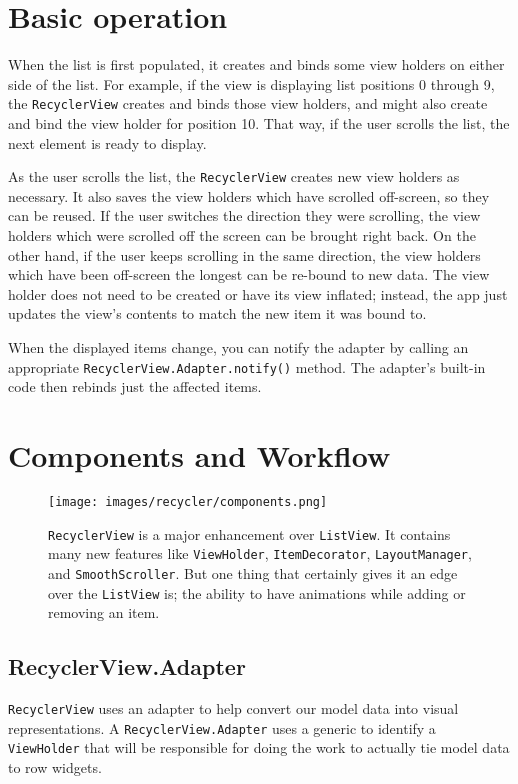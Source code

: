 \section{Basic operation}
When the list is first populated, it creates and binds some view holders on either side of the list.
For example, if the view is displaying list positions 0 through 9, the \lstinline!RecyclerView! creates and binds those view holders, and might also create and bind the view holder for position 10.
That way, if the user scrolls the list, the next element is ready to display.

As the user scrolls the list, the \lstinline!RecyclerView! creates new view holders as necessary.
It also saves the view holders which have scrolled off-screen, so they can be reused.
If the user switches the direction they were scrolling, the view holders which were scrolled off the screen can be brought right back.
On the other hand, if the user keeps scrolling in the same direction, the view holders which have been off-screen the longest can be re-bound to new data.
The view holder does not need to be created or have its view inflated; instead, the app just updates the view's contents to match the new item it was bound to.

When the displayed items change, you can notify the adapter by calling an appropriate \lstinline!RecyclerView.Adapter.notify()! method.
The adapter's built-in code then rebinds just the affected items.

\section{Components and Workflow}

\begin{figure}
	\texttt{[image: images/recycler/components.png]}
	\caption{ \lstinline!RecyclerView! is a major enhancement over \lstinline!ListView!.
It contains many new features like \lstinline!ViewHolder!, \lstinline!ItemDecorator!, \lstinline!LayoutManager!, and \lstinline!SmoothScroller!.
But one thing that certainly gives it an edge over the \lstinline!ListView! is; the ability to have animations while adding or removing an item.}
	\label{fig:recyclercomponents}
\end{figure}


\subsection{RecyclerView.Adapter}
\lstinline!RecyclerView! uses an adapter to help convert our model data into visual representations.
A \lstinline!RecyclerView.Adapter!  uses a generic to identify a \lstinline!ViewHolder! that will be responsible for doing the work to actually tie model data to row widgets.

